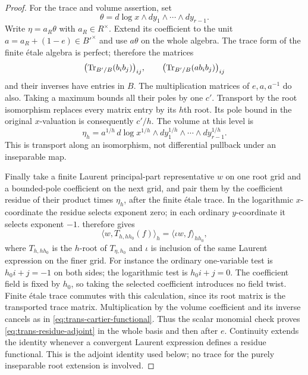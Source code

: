 \begin{proof}
For the trace and volume assertion, set
\[
 \theta=d\log x\wedge dy_1\wedge\cdots\wedge dy_{r-1}.
\]
Write $\eta=a_R\theta$ with $a_R\in R^\times$.  Extend its coefficient
to the unit $a=a_R+(1-e)\in B'^\times$ and use $a\theta$ on the whole
algebra.  The trace form of the finite \'{e}tale algebra is perfect;
therefore the matrices
\[
 \bigl(\operatorname{Tr}_{B'/B}(b_i b_j)\bigr)_{ij},\qquad
 \bigl(\operatorname{Tr}_{B'/B}(a b_i b_j)\bigr)_{ij}
\]
and their inverses have entries in $B$.  The multiplication matrices
of $e,a,a^{-1}$ do also.  Taking a maximum bounds all their poles by
one $c'$.  Transport by the root isomorphism replaces every matrix
entry by its $h$th root.  Its pole bound in the original $x$-valuation
is consequently $c'/h$.  The volume at this level is
\[
 \eta_h=a^{1/h}\,d\log x^{1/h}\wedge
                   dy_1^{1/h}\wedge\cdots\wedge dy_{r-1}^{1/h}.
\]
This is transport along an isomorphism, not differential pullback
under an inseparable map.

Finally take a finite Laurent principal-part representative $w$ on
one root grid and a bounded-pole coefficient on the next grid, and
pair them by the coefficient residue of their product times
$\eta_h$, after the finite \'{e}tale trace.  In the logarithmic
$x$-coordinate the residue selects exponent zero; in each ordinary
$y$-coordinate it selects exponent $-1$.   therefore gives
\begin{equation}
 \langle w,T_{h,hh_0}(f)\rangle_h
       =\langle \iota w,f\rangle_{hh_0},
 \label{eq:trans-residue-adjoint}
\end{equation}
where $T_{h,hh_0}$ is the $h$-root of $T_{\eta,h_0}$ and $\iota$ is
inclusion of the same Laurent expression on the finer grid.
For instance the ordinary one-variable test is
$h_0i+j=-1$ on both sides; the logarithmic test is $h_0i+j=0$.
The coefficient field is fixed by $h_0$, so taking the selected
coefficient introduces no field twist.  Finite \'{e}tale trace
commutes with this calculation, since its root matrix is the
transported trace matrix.  Multiplication by the volume coefficient
and its inverse cancels as in
\cref{eq:trans-cartier-functional}.  Thus the scalar monomial check
proves \cref{eq:trans-residue-adjoint} in the whole basis and then
after $e$.  Continuity extends the identity whenever a convergent
Laurent expression defines a residue functional.  This is the
adjoint identity used below; no trace for the purely inseparable
root extension is involved.
\end{proof}

